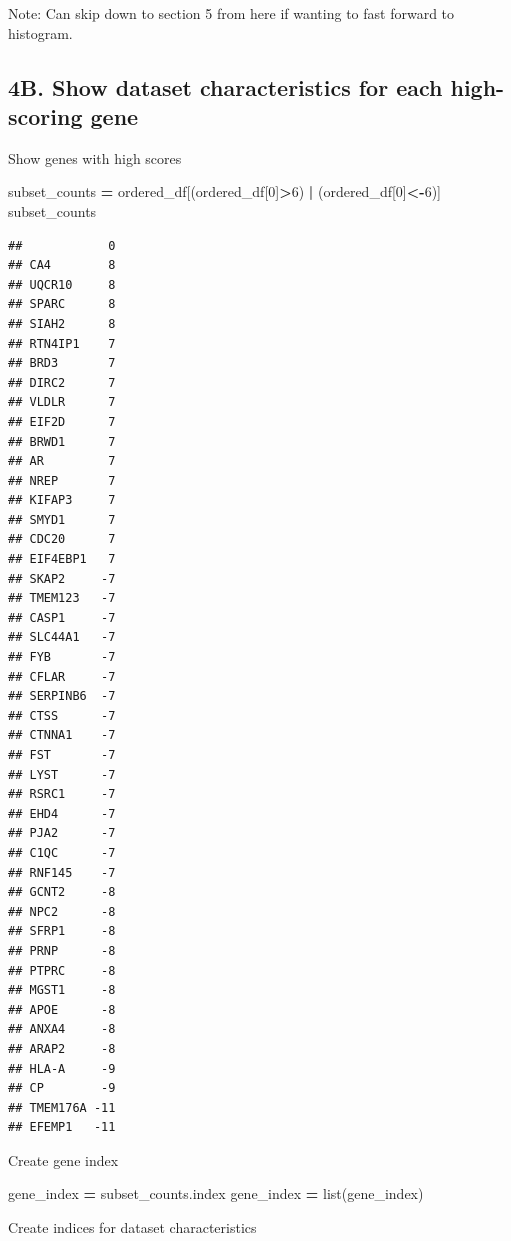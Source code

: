 \documentclass[
]{article}
\newenvironment{Shaded}{\begin{snugshade}}{\end{snugshade}}
\newcommand{\BuiltInTok}[1]{#1}
\newcommand{\DecValTok}[1]{\textcolor[rgb]{0.00,0.00,0.81}{#1}}
\newcommand{\NormalTok}[1]{#1}
\newcommand{\OperatorTok}[1]{\textcolor[rgb]{0.81,0.36,0.00}{\textbf{#1}}}
\begin{document}
Note: Can skip down to section 5 from here if wanting to fast forward to
histogram.

\hypertarget{b.-show-dataset-characteristics-for-each-high-scoring-gene}{%
\subsection{4B. Show dataset characteristics for each high-scoring
gene}\label{b.-show-dataset-characteristics-for-each-high-scoring-gene}}

Show genes with high scores

\begin{Shaded}
\begin{Highlighting}[]
\NormalTok{subset_counts }\OperatorTok{=}\NormalTok{ ordered_df[(ordered_df[}\DecValTok{0}\NormalTok{]}\OperatorTok{>}\DecValTok{6}\NormalTok{) }\OperatorTok{|}\NormalTok{ (ordered_df[}\DecValTok{0}\NormalTok{]}\OperatorTok{<-}\DecValTok{6}\NormalTok{)]}
\NormalTok{subset_counts}
\end{Highlighting}
\end{Shaded}

\begin{verbatim}
##            0
## CA4        8
## UQCR10     8
## SPARC      8
## SIAH2      8
## RTN4IP1    7
## BRD3       7
## DIRC2      7
## VLDLR      7
## EIF2D      7
## BRWD1      7
## AR         7
## NREP       7
## KIFAP3     7
## SMYD1      7
## CDC20      7
## EIF4EBP1   7
## SKAP2     -7
## TMEM123   -7
## CASP1     -7
## SLC44A1   -7
## FYB       -7
## CFLAR     -7
## SERPINB6  -7
## CTSS      -7
## CTNNA1    -7
## FST       -7
## LYST      -7
## RSRC1     -7
## EHD4      -7
## PJA2      -7
## C1QC      -7
## RNF145    -7
## GCNT2     -8
## NPC2      -8
## SFRP1     -8
## PRNP      -8
## PTPRC     -8
## MGST1     -8
## APOE      -8
## ANXA4     -8
## ARAP2     -8
## HLA-A     -9
## CP        -9
## TMEM176A -11
## EFEMP1   -11
\end{verbatim}

Create gene index

\begin{Shaded}
\begin{Highlighting}[]
\NormalTok{gene_index }\OperatorTok{=}\NormalTok{ subset_counts.index}
\NormalTok{gene_index }\OperatorTok{=} \BuiltInTok{list}\NormalTok{(gene_index)}
\end{Highlighting}
\end{Shaded}

Create indices for dataset characteristics
\end{document}
